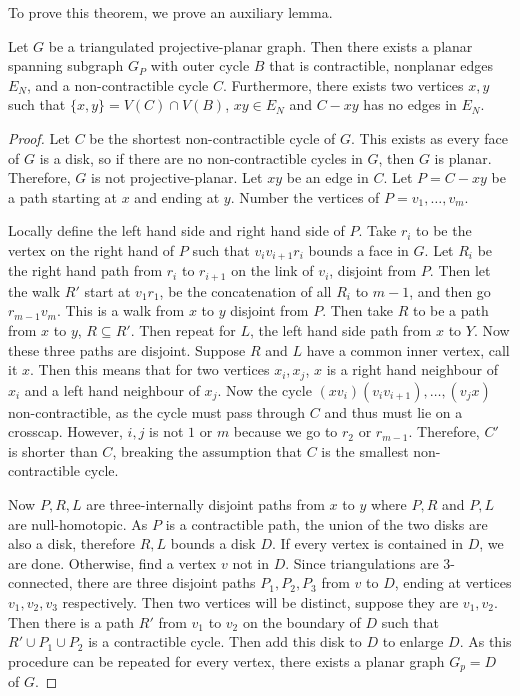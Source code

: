 To prove this theorem, we prove an auxiliary lemma. 

\begin{lemma}\label{lem:proj_planar triangulation}
    Let $G$ be a triangulated projective-planar graph. Then there exists a planar spanning subgraph $G_P$ with outer cycle $B$ that is contractible, nonplanar edges $E_N$, and a non-contractible cycle $C$. Furthermore, there exists two vertices $x, y$ such that $\{x, y \} = V(C) \cap V(B)$, $xy \in E_N$ and $C - xy$ has no edges in $E_N$. 
\end{lemma}

\begin{proof}
    Let $C$ be the shortest non-contractible cycle of $G$. This exists as every face of $G$ is a disk, so if there are no non-contractible cycles in $G$, then $G$ is planar. Therefore, $G$ is not projective-planar. Let $xy$ be an edge in $C$. Let $P = C - xy$ be a path starting at $x$ and ending at $y$. 
    Number the vertices of $P = v_1, \ldots, v_m$. 

    Locally define the left hand side and right hand side of $P$. Take $r_i$ to be the vertex on the right hand of $P$ such that $v_i v_{i + 1} r_i$ bounds a face in $G$. Let $R_i$ be the right hand path from $r_i$ to $r_{i + 1}$ on the link of $v_i$, disjoint from $P$. Then let the walk $R'$ start at $v_1 r_1$, be the concatenation of all $R_i$ to $m-1$, and then go $r_{m-1} v_m$. This is a walk from $x$ to $y$ disjoint from $P$. Then take $R$ to be a path from $x$ to $y$, $R \subseteq R'$. Then repeat for $L$, the left hand side path from $x$ to $Y$. Now these three paths are disjoint. Suppose $R$ and $L$ have a common inner vertex, call it $x$. Then this means that for two vertices $x_i, x_j$, $x$ is a right hand neighbour of $x_i$ and a left hand neighbour of $x_j$. Now the cycle $(x v_i) (v_i v_{i + 1}), \ldots , (v_j x)$ non-contractible, as the cycle must pass through $C$ and thus must lie on a crosscap. However, $i, j$ is not $1$ or $m$ because we go to $r_2$ or $r_{m-1}$. Therefore, $C'$ is shorter than $C$, breaking the assumption that $C$ is the smallest non-contractible cycle.

    Now $P, R, L$ are three-internally disjoint paths from $x$ to $y$ where $P, R$ and $P, L$ are null-homotopic. As $P$ is a contractible path, the union of the two disks are also a disk, therefore $R, L$ bounds a disk $D$. If every vertex is contained in $D$, we are done. Otherwise, find a vertex $v$ not in $D$. Since triangulations are 3-connected, there are three disjoint paths $P_1, P_2, P_3$ from $v$ to $D$, ending at vertices $v_1, v_2, v_3$ respectively. Then two vertices will be distinct, suppose they are $v_1, v_2$. Then there is a path $R'$ from $v_1$ to $v_2$ on the boundary of $D$ such that $R' \cup P_1 \cup P_2$ is a contractible cycle. Then add this disk to $D$ to enlarge $D$. As this procedure can be repeated for every vertex, there exists a planar graph $G_p = D$ of $G$. 
\end{proof}

